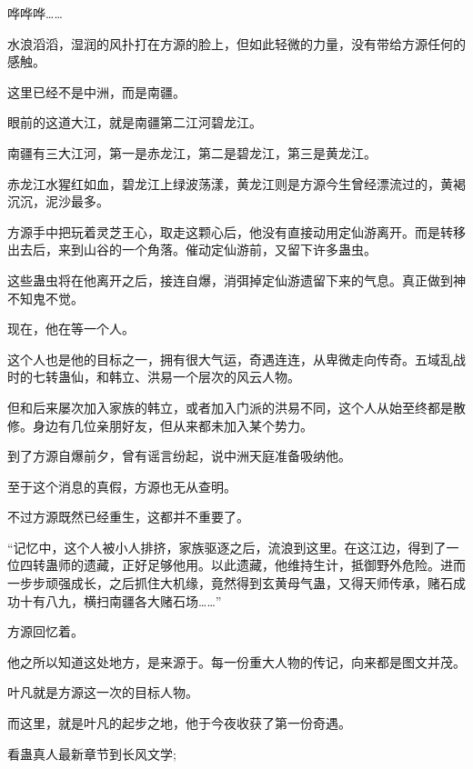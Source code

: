\begin{this_body}
哗哗哗……

水浪滔滔，湿润的风扑打在方源的脸上，但如此轻微的力量，没有带给方源任何的感触。

这里已经不是中洲，而是南疆。

眼前的这道大江，就是南疆第二江河碧龙江。

南疆有三大江河，第一是赤龙江，第二是碧龙江，第三是黄龙江。

赤龙江水猩红如血，碧龙江上绿波荡漾，黄龙江则是方源今生曾经漂流过的，黄褐沉沉，泥沙最多。

方源手中把玩着灵芝王心，取走这颗心后，他没有直接动用定仙游离开。而是转移出去后，来到山谷的一个角落。催动定仙游前，又留下许多蛊虫。

这些蛊虫将在他离开之后，接连自爆，消弭掉定仙游遗留下来的气息。真正做到神不知鬼不觉。

现在，他在等一个人。

这个人也是他的目标之一，拥有很大气运，奇遇连连，从卑微走向传奇。五域乱战时的七转蛊仙，和韩立、洪易一个层次的风云人物。

但和后来屡次加入家族的韩立，或者加入门派的洪易不同，这个人从始至终都是散修。身边有几位亲朋好友，但从来都未加入某个势力。

到了方源自爆前夕，曾有谣言纷起，说中洲天庭准备吸纳他。

至于这个消息的真假，方源也无从查明。

不过方源既然已经重生，这都并不重要了。

“记忆中，这个人被小人排挤，家族驱逐之后，流浪到这里。在这江边，得到了一位四转蛊师的遗藏，正好足够他用。以此遗藏，他维持生计，抵御野外危险。进而一步步顽强成长，之后抓住大机缘，竟然得到玄黄母气蛊，又得天师传承，赌石成功十有八九，横扫南疆各大赌石场……”

方源回忆着。

他之所以知道这处地方，是来源于。每一份重大人物的传记，向来都是图文并茂。

叶凡就是方源这一次的目标人物。

而这里，就是叶凡的起步之地，他于今夜收获了第一份奇遇。

看蛊真人最新章节到长风文学;

\end{this_body}

